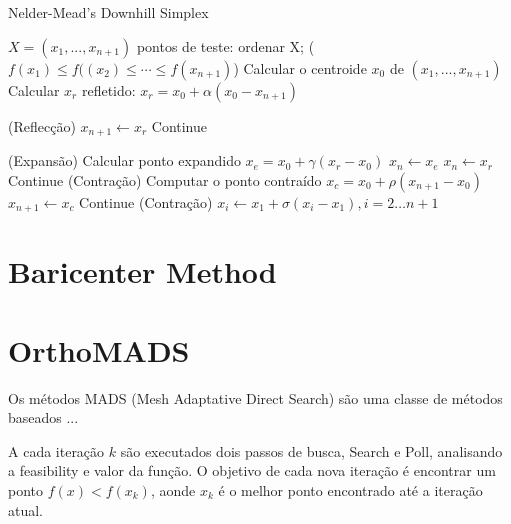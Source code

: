 \begin{algorithm}
    \caption{Nelder-Mead's Downhill Simplex}
    \label{alg:int_point_ocp}
    \begin{algorithmic}[1] %
        \Require $X = (x_1, ... , x_{n+1})$ pontos de teste:
                \State ordenar X; ($f(x _1) \leq f(({x} _2) \leq \cdots \leq f(x_{n+1})$) 
                \State Calcular o centroide $x_0$ de $(x_{1}, ... , x_{n+1})$
                \State Calcular $x_r$ refletido: $x_r = x_0 + \alpha(x_0 - x_{n+1})$ 
                
(Reflecção)                
                    \State $x_{n+1} \gets x_r$
                    \State Continue
                \EndIf

(Expansão)
                    \State Calcular ponto expandido $x_e = x_0 + \gamma(x_r - x_0) $
                        \State $x_n \gets x_e$
                    \Else
                        \State $x_n \gets x_r$                  
                    \EndIf
                    \State Continue
                \EndIf
(Contração)
                \State Computar o ponto contraído $x_c = x_0 + \rho(x_{n+1} - x_0)$
                    \State $x_{n+1} \gets x_c$
                    \State Continue             
                \EndIf
(Contração)
                \State $x_i \gets x_1 + \sigma(x_i - x_1), i=2 \dots n+1$
            \EndWhile
    \end{algorithmic}
\end{algorithm}



%
\section{Baricenter Method}


\section{OrthoMADS}

Os métodos MADS (Mesh Adaptative Direct Search) são uma classe de métodos baseados ...


A cada iteração $ k $ são executados dois passos de busca, Search e Poll, analisando a feasibility e valor da função. O objetivo de cada nova iteração é encontrar um ponto $f(x) < f(x_k)$, aonde $x_k$ é o melhor ponto encontrado até a iteração atual. 

